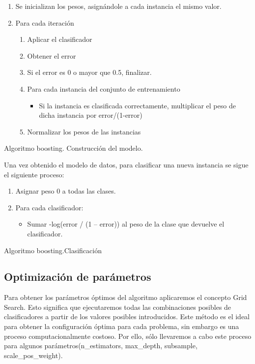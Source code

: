 \begin{algorithm}
	\begin{enumerate}
		\item Se inicializan los pesos, asignándole a cada instancia el mismo valor.
		\item Para cada iteración
		\begin{enumerate}
			\item Aplicar el clasificador 
			\item Obtener el error
			\item Si el error es 0 o mayor que 0.5, finalizar.
			\item Para cada instancia del conjunto de entrenamiento
			\begin{itemize}
				\item Si la instancia es clasificada correctamente, multiplicar el peso de dicha instancia por error/(1-error)
				
			\end{itemize}
			\item Normalizar los pesos de las instancias
		\end{enumerate}
	\end{enumerate}
	\caption{Algoritmo boosting. Construcción del modelo.}
\end{algorithm} 

Una vez obtenido el modelo de datos, para clasificar una nueva instancia se sigue el siguiente proceso:
\begin{algorithm}
	\begin{enumerate}
		\item Asignar peso 0 a todas las clases.
		\item Para cada clasificador:
		\begin{itemize}
			\item Sumar -log(error / (1 – error)) al peso de la clase que devuelve el clasificador.
		\end{itemize}
	\end{enumerate}
	\caption{Algoritmo boosting.Clasificación}
\end{algorithm}

\subsection{Optimización de parámetros}
Para obtener los parámetros óptimos del algoritmo aplicaremos el concepto Grid
Search. Esto significa que ejecutaremos todas las combinaciones posibles de
clasificadores a partir de los valores posibles introducidos. Este método es el
ideal para obtener la configuración óptima para cada problema, sin embargo es
una proceso computacionalmente costoso. Por ello, sólo llevaremos a cabo este
proceso para algunos parámetros(n\_estimators, max\_depth, subsample,
scale\_pos\_weight).
\medskip

